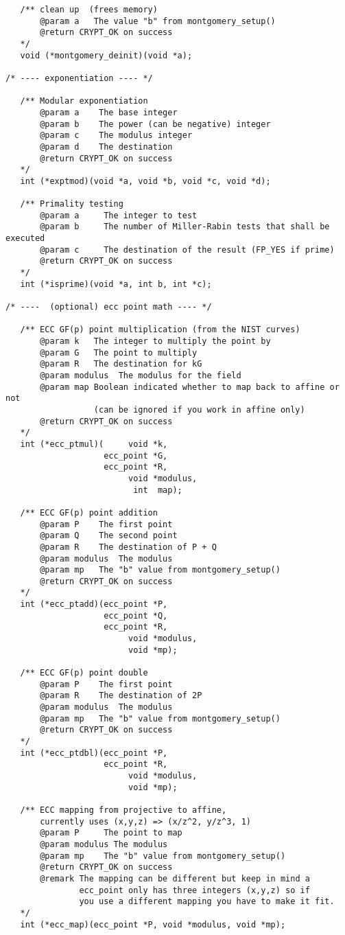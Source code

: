 \documentclass[synpaper]{book}
\begin{document}
\begin{small}
\begin{verbatim}
   /** clean up  (frees memory)
       @param a   The value "b" from montgomery_setup()
       @return CRYPT_OK on success
   */
   void (*montgomery_deinit)(void *a);

/* ---- exponentiation ---- */

   /** Modular exponentiation
       @param a    The base integer
       @param b    The power (can be negative) integer
       @param c    The modulus integer
       @param d    The destination
       @return CRYPT_OK on success
   */
   int (*exptmod)(void *a, void *b, void *c, void *d);

   /** Primality testing
       @param a     The integer to test
       @param b     The number of Miller-Rabin tests that shall be executed
       @param c     The destination of the result (FP_YES if prime)
       @return CRYPT_OK on success
   */
   int (*isprime)(void *a, int b, int *c);

/* ----  (optional) ecc point math ---- */

   /** ECC GF(p) point multiplication (from the NIST curves)
       @param k   The integer to multiply the point by
       @param G   The point to multiply
       @param R   The destination for kG
       @param modulus  The modulus for the field
       @param map Boolean indicated whether to map back to affine or not
                  (can be ignored if you work in affine only)
       @return CRYPT_OK on success
   */
   int (*ecc_ptmul)(     void *k,
                    ecc_point *G,
                    ecc_point *R,
                         void *modulus,
                          int  map);

   /** ECC GF(p) point addition
       @param P    The first point
       @param Q    The second point
       @param R    The destination of P + Q
       @param modulus  The modulus
       @param mp   The "b" value from montgomery_setup()
       @return CRYPT_OK on success
   */
   int (*ecc_ptadd)(ecc_point *P,
                    ecc_point *Q,
                    ecc_point *R,
                         void *modulus,
                         void *mp);

   /** ECC GF(p) point double
       @param P    The first point
       @param R    The destination of 2P
       @param modulus  The modulus
       @param mp   The "b" value from montgomery_setup()
       @return CRYPT_OK on success
   */
   int (*ecc_ptdbl)(ecc_point *P,
                    ecc_point *R,
                         void *modulus,
                         void *mp);

   /** ECC mapping from projective to affine,
       currently uses (x,y,z) => (x/z^2, y/z^3, 1)
       @param P     The point to map
       @param modulus The modulus
       @param mp    The "b" value from montgomery_setup()
       @return CRYPT_OK on success
       @remark The mapping can be different but keep in mind a
               ecc_point only has three integers (x,y,z) so if
               you use a different mapping you have to make it fit.
   */
   int (*ecc_map)(ecc_point *P, void *modulus, void *mp);


\end{verbatim}
\end{small}
\end{document}
